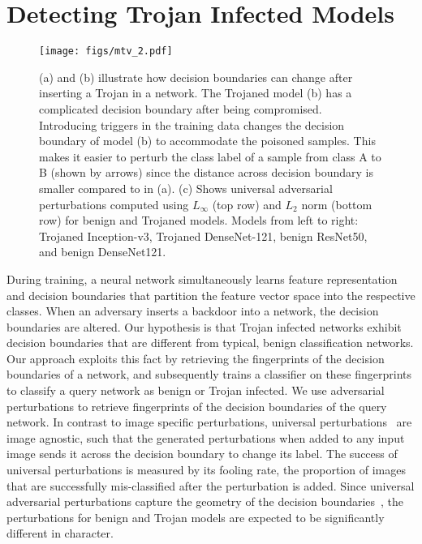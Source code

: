 \documentclass{article}
\begin{document}
\vspace{-4mm}
\section{Detecting Trojan Infected Models}
\label{sec:blind}
\vspace{-3mm}

\begin{figure}
\centering
\texttt{[image: figs/mtv\_2.pdf]}
\vspace{-10mm}
\caption{(a) and (b) illustrate how decision boundaries can change after inserting a Trojan in a network. The Trojaned model (b) has a complicated decision boundary after being compromised.
Introducing triggers in the training data changes the decision boundary of model (b) to accommodate the poisoned samples. This makes it easier to perturb the class label of a sample from class A to B (shown by arrows) since the distance across decision boundary is smaller compared to in (a). (c) Shows universal adversarial perturbations computed using $L_{\infty}$ (top row) and $L_{2}$ norm (bottom row) for benign and Trojaned models. Models from left to right: Trojaned Inception-v3, Trojaned DenseNet-121, benign ResNet50, and benign DenseNet121.}
\label{fig:db}
\vspace{-4mm}
\end{figure}










During training, a neural network simultaneously learns feature representation and decision boundaries that partition the feature vector space into the respective classes. When an adversary inserts a backdoor into a network, the decision boundaries are altered. Our hypothesis is that Trojan infected networks exhibit decision boundaries that are different from typical, benign classification networks. Our approach exploits this fact by retrieving the fingerprints of the decision boundaries of a network, and subsequently trains a classifier on these fingerprints to classify a query network as benign or Trojan infected. We use adversarial perturbations to retrieve fingerprints of the decision boundaries of the query network. In contrast to image specific perturbations, universal perturbations~\cite{moosavi2017universal} are image agnostic,  such that the generated perturbations when added to any input image sends it across the decision boundary to change its label. The success of universal perturbations is measured by its fooling rate, the  proportion of images that are successfully mis-classified after the perturbation is added. Since universal adversarial perturbations capture the geometry of the decision boundaries~\cite{moosavi2017universal}, the perturbations for benign and Trojan models are expected to be significantly different in character. 
\end{document}
